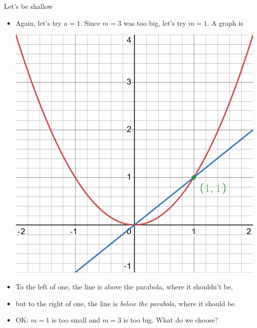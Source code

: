 \documentclass[usenames,dvipsnames,fleqn,leqno,10pt, pdflatex]{beamer}
\begin{document}
\begin{frame}{Let's be shallow}


\begin{itemize}
   \item Again, let's try $a=1$. Since $m=3$ was too big, let's try $m=1$. A graph is
   
   \begin{center}
\includegraphics[scale=0.125]{desmos-graph(8).png}

\end{center}
\item To the left of one, the line is above the parabola, where it shouldn't  be,

\item but to the right of one, the line is \emph{below the parabola}, where it
should be.

\item OK: $m=1$ is too small and $m=3$ is too big. What do we choose?

\end{itemize}




\end{frame}
\end{document}
